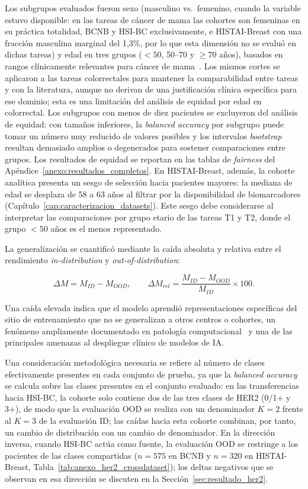 Los subgrupos evaluados fueron sexo (masculino vs.\ femenino, cuando la variable estuvo disponible: en las tareas de cáncer de mama las cohortes son femeninas en su práctica totalidad, BCNB y HSI-BC exclusivamente, e HISTAI-Breast con una fracción masculina marginal del 1,3\%, por lo que esta dimensión no se evaluó en dichas tareas) y edad en tres grupos ($<50$, 50--70 y $\geq 70$ años), basados en rangos clínicamente relevantes para cáncer de mama~\parencite{lin2025fairpath}. Los mismos cortes se aplicaron a las tareas colorrectales para mantener la comparabilidad entre tareas y con la literatura, aunque no derivan de una justificación clínica específica para ese dominio; esta es una limitación del análisis de equidad por edad en colorrectal. Los subgrupos con menos de diez pacientes se excluyeron del análisis de equidad: con tamaños inferiores, la \textit{balanced accuracy} por subgrupo puede tomar un número muy reducido de valores posibles y los intervalos \textit{bootstrap} resultan demasiado amplios o degenerados para sostener comparaciones entre grupos. Los resultados de equidad se reportan en las tablas de \textit{fairness} del Apéndice~\ref{anexo:resultados_completos}. En HISTAI-Breast, además, la cohorte analítica presenta un sesgo de selección hacia pacientes mayores: la mediana de edad se desplaza de 58 a 63 años al filtrar por la disponibilidad de biomarcadores (Capítulo~\ref{cap:caracterizacion_datasets}). Este sesgo debe considerarse al interpretar las comparaciones por grupo etario de las tareas T1 y T2, donde el grupo $<50$ años es el menos representado.

La generalización se cuantificó mediante la caída absoluta y relativa entre el rendimiento \textit{in-distribution} y \textit{out-of-distribution}:

\begin{equation}
\Delta M = M_{ID} - M_{OOD},
\qquad
\Delta M_{rel} = \frac{M_{ID} - M_{OOD}}{M_{ID}} \times 100.
\label{eq:delta_m}
\end{equation}

Una caída elevada indica que el modelo aprendió representaciones específicas del sitio de entrenamiento que no se generalizan a otros centros o cohortes, un fenómeno ampliamente documentado en patología computacional~\parencite{huang2025flex, openmibood2025} y una de las principales amenazas al despliegue clínico de modelos de IA. 

Una consideración metodológica necesaria se refiere al número de clases efectivamente presentes en cada conjunto de prueba, ya que la \textit{balanced accuracy} se calcula sobre las clases presentes en el conjunto evaluado: en las transferencias hacia HSI-BC, la cohorte solo contiene dos de las tres clases de HER2 (0/1+ y 3+), de modo que la evaluación OOD se realiza con un denominador $K=2$ frente al $K=3$ de la evaluación ID; las caídas hacia esta cohorte combinan, por tanto, un cambio de distribución con un cambio de denominador. En la dirección inversa, cuando HSI-BC actúa como fuente, la evaluación OOD se restringe a los pacientes de las clases compartidas ($n=575$ en BCNB y $n=320$ en HISTAI-Breast, Tabla~\ref{tab:anexo_her2_crossdataset}); los deltas negativos que se observan en esa dirección se discuten en la Sección~\ref{sec:resultado_her2}.

